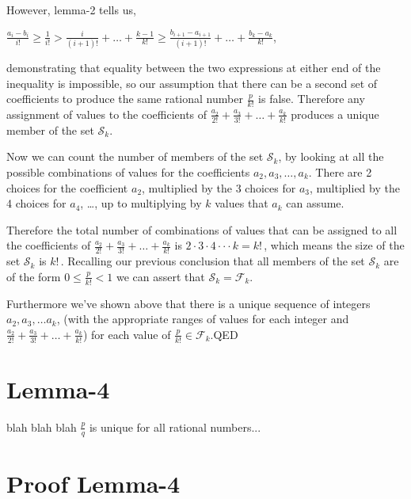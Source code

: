 \documentclass{article}
\begin{document}
However, lemma-2 tells us,\par
\begin{center}
\(\frac{a_i - b_i}{i!} \ge{} \frac{1}{i!} > \frac{i}{(i+1)!} + \dots{} + \frac{k-1}{k!} \ge{} \frac{b_{i+1} - a_{i+1}}{(i+1)!} + \dots{} + \frac{b_k - a_k}{k!}\),
\end{center}\par
demonstrating that equality between the two expressions at either end of the inequality
is impossible, so our assumption that there can be a second set
of coefficients to produce the same rational number \(\frac{p}{k!}\) is false.
Therefore any assignment of values to the coefficients of
\(\frac{a_2}{2!} + \frac{a_3}{3!} + \dots{} + \frac{a_k}{k!}\)
produces a unique member of the set \(\mathcal{S}_k\).

Now we can count the number of members of the set \(\mathcal{S}_k\), by looking at all the
possible combinations of values for the coefficients \(a_2, a_3, \dots{}, a_k\).
There are 2 choices for the coefficient \(a_2\),
multiplied by the 3 choices for \(a_3\),
multiplied by the 4 choices for \(a_4\),
\dots{},
up to multiplying by \(k\) values that \(a_k\) can assume.

Therefore the total number of combinations of values
that can be assigned to all the coefficients of \(\frac{a_2}{2!} + \frac{a_3}{3!} + \dots{} + \frac{a_k}{k!}\)
is \(2\cdot{}3\cdot{}4\cdot\cdot{}\cdot{}k = k!\,\),
which means the size of the set \(\mathcal{S}_k\) is \(k!\, \). Recalling our previous conclusion that
all members of the set \(\mathcal{S}_k\) are of the form \(0\le{}\frac{p}{k!}<1\) we
can assert that \(\mathcal{S}_k = \mathcal{F}_k\).

Furthermore we've shown above that there is a unique sequence of integers \(a_2, a_3, \dots{} a_k\),
(with the appropriate ranges of values for each integer
and \(\frac{a_2}{2!} + \frac{a_3}{3!} + \dots{} + \frac{a_k}{k!}\))
for each value of \(\frac{p}{k!} \in \mathcal{F}_k\).\qquad QED

\section*{Lemma-4}

blah blah blah \(\frac{p}{q}\) is unique for all rational numbers...

\section*{Proof Lemma-4}
\end{document}
